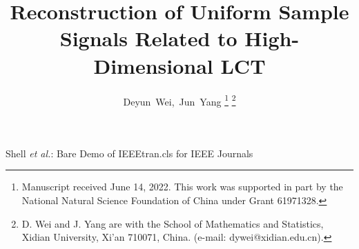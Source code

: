 \documentclass[journal]{IEEEtran}
\begin{document}
\title{Reconstruction of Uniform Sample Signals Related to High-Dimensional LCT}

\author{Deyun~Wei,~Jun~Yang %
\thanks{Manuscript received June 14, 2022. This work was supported in part by the National Natural Science Foundation of China under Grant 61971328.}%
\thanks{D. Wei and J. Yang are with the School of Mathematics and Statistics, Xidian University, Xi’an 710071, China. (e-mail: dywei@xidian.edu.cn).}%
}

{Shell \MakeLowercase{\textit{et al.}}: Bare Demo of IEEEtran.cls for IEEE Journals}
\maketitle

\begin{abstract}
	
\end{abstract}
\end{document}
